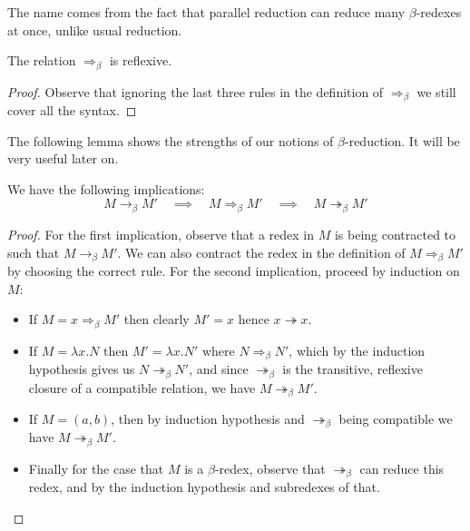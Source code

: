 \begin{remark}
    The name comes from the fact that parallel reduction can reduce many $\beta$-redexes at once, unlike usual reduction.
\end{remark}

\begin{cor}\label{beta_par_refl}
    The relation $\Rightarrow_\beta$ is reflexive.
\end{cor}

\begin{proof}
    Observe that ignoring the last three rules in the definition of $\Rightarrow_\beta$ we still cover all the syntax.
\end{proof}

The following lemma shows the strengths of our notions of $\beta$-reduction. It will be very useful later on.

\begin{lemma}\label{beta_par_imp}
    We have the following implications:
    $$
        M \to_\beta M' \quad \implies \quad M \Rightarrow_\beta M' \quad \implies \quad M \twoheadrightarrow_\beta M'
    $$
\end{lemma}

\begin{proof}
    For the first implication, observe that a redex in $M$ is being contracted to such that $M \to_\beta M'$. We can also contract the redex in the definition of $M \Rightarrow_\beta M'$ by choosing the correct rule. For the second implication, proceed by induction on $M$:
    \begin{itemize}
        \item If $M = x \Rightarrow_\beta M'$ then clearly $M'=x$ hence $x \twoheadrightarrow x$.
        \item If $M = \lambda x . N$ then $M' = \lambda x . N'$ where $N \Rightarrow_\beta N'$, which by the induction hypothesis gives us $N \twoheadrightarrow_\beta N'$, and since $\twoheadrightarrow_\beta$ is the transitive, reflexive closure of a compatible relation, we have $M \twoheadrightarrow_\beta M'$.
        \item If $M = (a, b)$, then by induction hypothesis and $\twoheadrightarrow_\beta$ being compatible we have $M \twoheadrightarrow_\beta M'$.
        \item Finally for the case that $M$ is a $\beta$-redex, observe that $\twoheadrightarrow_\beta$ can reduce this redex, and by the induction hypothesis and subredexes of that.
    \end{itemize}
\end{proof}

